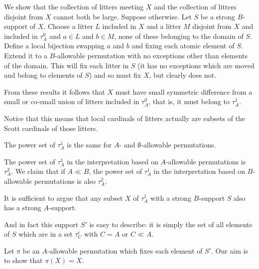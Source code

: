 \documentclass{slides}
\begin{document}
\begin{slide}
We show that the collection of litters meeting $X$ and the collection of litters disjoint from $X$ cannot both be large.  Suppose otherwise.  Let $S$ be a strong $B$-support of $X$.
Choose a litter $L$ included in $X$ and a litter $M$ disjoint from $X$ and included in $\tau^0_A$  and $a \in L$ and $b \in M$, none of these belonging to the domain of $S$.  Define a local bijection swapping $a$ and $b$ and fixing each atomic element of $S$.  Extend it to a $B$-allowable permutation with no exceptions other than elements of the domain.  This will fix
each litter in $S$ (it has no exceptions which are moved and belong to elements of $S$) and so must fix $X$, but clearly does not.

From these results it follows that $X$ must have small symmetric difference from a small or co-small union of litters included in $\tau^0_A$, that is, it must belong to $\tau^1_A$.

Notice that this means that local cardinals of litters actually are subsets of the Scott cardinals of those litters.

\end{slide}

{\Large The power set of $\tau^1_A$ is the same for $A$- and $\emptyset$-allowable permutations.}

The power set of $\tau^1_A$ in the interpretation based on $A$-allowable permutations is $\tau^2_A$.  We claim that if $A \ll B$, the power set of  $\tau^1_A$ in
the interpretation based on $B$-allowable permutations is also $\tau^2_A$.

It is sufficient to argue that any subset $X$ of $\tau^1_A$ with a strong $B$-support $S$ also has a strong $A$-support.

And in fact this support $S'$ is easy to describe:  it is simply the set of all elements of $S$ which are in a set $\tau^i_C$ with $C=A$ or $C \ll A$.

Let $\pi$ be an $A$-allowable permutation which fixes each element of $S'$.  Our aim is to show that $\pi(X)=X$.
\end{document}
